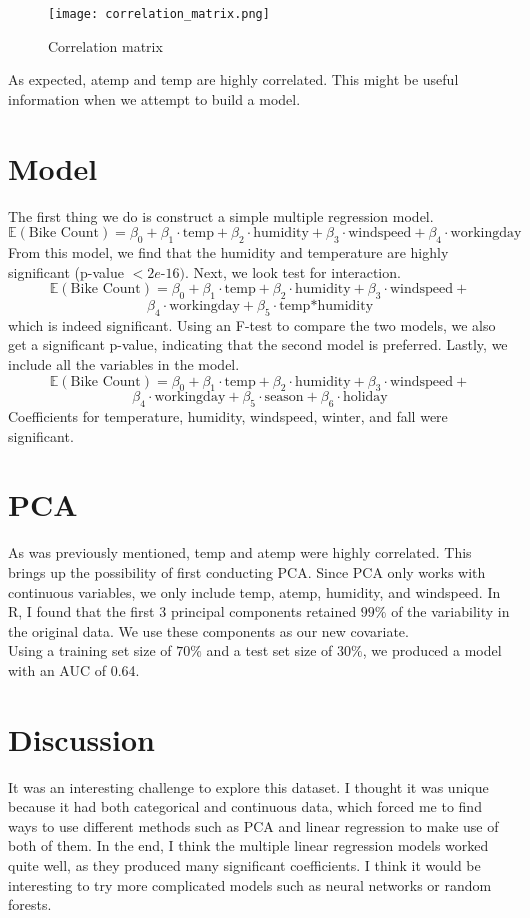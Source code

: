 \documentclass{article}
\begin{document}
\begin{figure}[htp]
    \centering
    \texttt{[image: correlation\_matrix.png]}
    \caption{Correlation matrix}
    \label{fig:my_label}
\end{figure}
As expected, atemp and temp are highly correlated. This might be useful information when we attempt to build a model.

\section{Model}
The first thing we do is construct a simple multiple regression model. 
$$\mathbb{E}(\text{Bike Count}) = \beta_{0} + \beta_{1} \cdot \text{temp} + \beta_{2} \cdot \text{humidity} + \beta_{3} \cdot \text{windspeed} + \beta_4 \cdot \text{workingday}
$$
From this model, we find that the humidity and temperature are highly significant (p-value $<2e$-$16)$. Next, we look test for interaction.
$$\mathbb{E}(\text{Bike Count}) = \beta_{0} + \beta_{1} \cdot \text{temp} + \beta_{2} \cdot \text{humidity} + \beta_{3} \cdot \text{windspeed}+ $$$$ \beta_4 \cdot \text{workingday} + \beta_5 \cdot \text{temp*humidity}
$$
which is indeed significant. Using an F-test to compare the two models, we also get a significant p-value, indicating that the second model is preferred. Lastly, we include all the variables in the model.
$$\mathbb{E}(\text{Bike Count}) = \beta_{0} + \beta_{1} \cdot \text{temp} + \beta_{2} \cdot \text{humidity} + \beta_{3} \cdot \text{windspeed} +$$$$ \beta_4 \cdot \text{workingday} + \beta_5 \cdot \text{season} + \beta_6 \cdot \text{holiday}
$$
Coefficients for temperature, humidity, windspeed, winter, and fall were significant.\\
\section{PCA}
\indent As was previously mentioned, temp and atemp were highly correlated. This brings up the possibility of first conducting PCA. Since PCA only works with continuous variables, we only include temp, atemp, humidity, and windspeed. In R, I found that the first 3 principal components retained $99\%$ of the variability in the original data. We use these components as our new covariate. \\
\indent Using a training set size of $70\%$ and a test set size of $30\%$, we produced a model with an AUC of 0.64.

\section*{Discussion}
It was an interesting challenge to explore this dataset. I thought it was unique because it had both categorical and continuous data, which forced me to find ways to use different methods such as PCA and linear regression to make use of both of them. In the end, I think the multiple linear regression models worked quite well, as they produced many significant coefficients. I think it would be interesting to try more complicated models such as neural networks or random forests.
\end{document}
